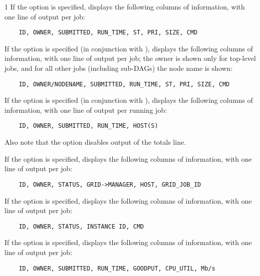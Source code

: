 \begin{ManPage}{\label{man-condor-q}}{1}
If the  option is specified,  displays the
following columns of information, with one line of output
per job:
\begin{verbatim}
    ID, OWNER, SUBMITTED, RUN_TIME, ST, PRI, SIZE, CMD
\end{verbatim}

If the  option is specified (in conjunction with ),
 displays the following columns of information, with one line
of output per job; the owner is shown only for top-level jobs, and for
all other jobs (including sub-DAGs) the node name is shown:
\begin{verbatim}
    ID, OWNER/NODENAME, SUBMITTED, RUN_TIME, ST, PRI, SIZE, CMD
\end{verbatim}

If the  option is specified (in conjunction with ),
 displays the following columns of information, with one line
of output per running job:
\begin{verbatim}
    ID, OWNER, SUBMITTED, RUN_TIME, HOST(S)
\end{verbatim}
Also note that the  option disables output of the
totals line.


If the  option is specified,  displays the
following columns of information, with one line of output per job:
\begin{verbatim}
    ID, OWNER, STATUS, GRID->MANAGER, HOST, GRID_JOB_ID
\end{verbatim}

If the  option is specified,  displays the
following columns of information, with one line of output per job:
\begin{verbatim}
    ID, OWNER, STATUS, INSTANCE ID, CMD
\end{verbatim}

If the  option is specified,  displays the
following columns of information, with one line of output per job:
\begin{verbatim}
    ID, OWNER, SUBMITTED, RUN_TIME, GOODPUT, CPU_UTIL, Mb/s
\end{verbatim}


\end{ManPage}
